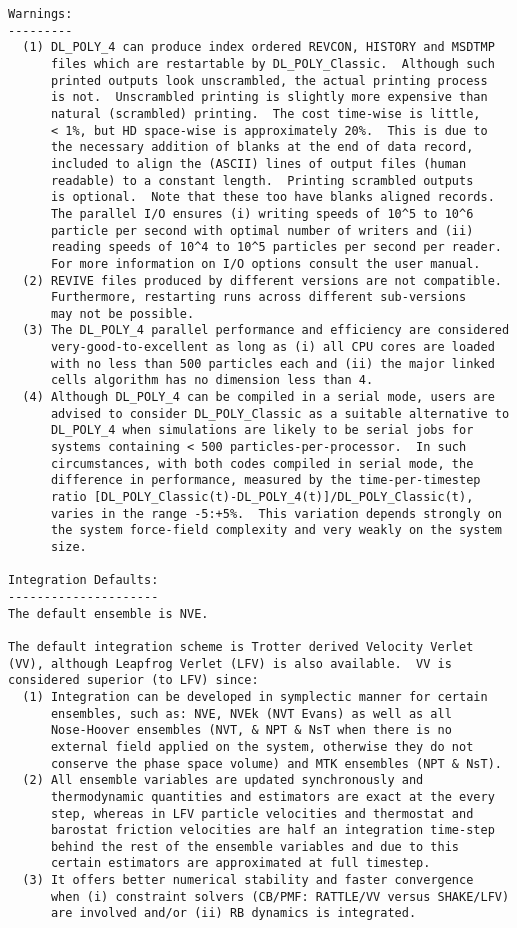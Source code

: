 \begin{verbatim}
Warnings:
---------
  (1) DL_POLY_4 can produce index ordered REVCON, HISTORY and MSDTMP
      files which are restartable by DL_POLY_Classic.  Although such
      printed outputs look unscrambled, the actual printing process
      is not.  Unscrambled printing is slightly more expensive than
      natural (scrambled) printing.  The cost time-wise is little,
      < 1%, but HD space-wise is approximately 20%.  This is due to
      the necessary addition of blanks at the end of data record,
      included to align the (ASCII) lines of output files (human
      readable) to a constant length.  Printing scrambled outputs
      is optional.  Note that these too have blanks aligned records.
      The parallel I/O ensures (i) writing speeds of 10^5 to 10^6
      particle per second with optimal number of writers and (ii)
      reading speeds of 10^4 to 10^5 particles per second per reader.
      For more information on I/O options consult the user manual.
  (2) REVIVE files produced by different versions are not compatible.
      Furthermore, restarting runs across different sub-versions
      may not be possible.
  (3) The DL_POLY_4 parallel performance and efficiency are considered
      very-good-to-excellent as long as (i) all CPU cores are loaded
      with no less than 500 particles each and (ii) the major linked
      cells algorithm has no dimension less than 4.
  (4) Although DL_POLY_4 can be compiled in a serial mode, users are
      advised to consider DL_POLY_Classic as a suitable alternative to
      DL_POLY_4 when simulations are likely to be serial jobs for
      systems containing < 500 particles-per-processor.  In such
      circumstances, with both codes compiled in serial mode, the
      difference in performance, measured by the time-per-timestep
      ratio [DL_POLY_Classic(t)-DL_POLY_4(t)]/DL_POLY_Classic(t),
      varies in the range -5:+5%.  This variation depends strongly on
      the system force-field complexity and very weakly on the system
      size.

Integration Defaults:
---------------------
The default ensemble is NVE.

The default integration scheme is Trotter derived Velocity Verlet
(VV), although Leapfrog Verlet (LFV) is also available.  VV is
considered superior (to LFV) since:
  (1) Integration can be developed in symplectic manner for certain
      ensembles, such as: NVE, NVEk (NVT Evans) as well as all
      Nose-Hoover ensembles (NVT, & NPT & NsT when there is no
      external field applied on the system, otherwise they do not
      conserve the phase space volume) and MTK ensembles (NPT & NsT).
  (2) All ensemble variables are updated synchronously and
      thermodynamic quantities and estimators are exact at the every
      step, whereas in LFV particle velocities and thermostat and
      barostat friction velocities are half an integration time-step
      behind the rest of the ensemble variables and due to this
      certain estimators are approximated at full timestep.
  (3) It offers better numerical stability and faster convergence
      when (i) constraint solvers (CB/PMF: RATTLE/VV versus SHAKE/LFV)
      are involved and/or (ii) RB dynamics is integrated.


\end{verbatim}
